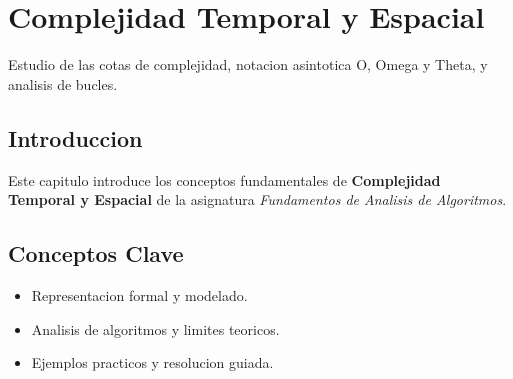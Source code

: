 \chapter{Complejidad Temporal y Espacial}
\label{ch:complejidad}

Estudio de las cotas de complejidad, notacion asintotica O, Omega y Theta, y analisis de bucles.

\section{Introduccion}
Este capitulo introduce los conceptos fundamentales de \textbf{Complejidad Temporal y Espacial} de la asignatura \textit{Fundamentos de Analisis de Algoritmos}.

\section{Conceptos Clave}
\begin{itemize}
    \item Representacion formal y modelado.
    \item Analisis de algoritmos y limites teoricos.
    \item Ejemplos practicos y resolucion guiada.
\end{itemize}
